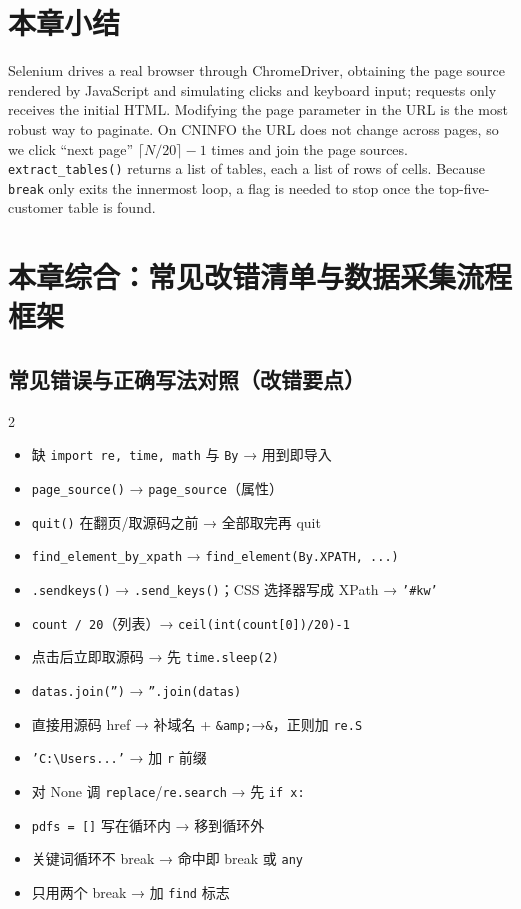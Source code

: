 \section{本章小结}
\begin{english}
Selenium drives a real browser through ChromeDriver, obtaining the page source rendered by JavaScript and simulating clicks and keyboard input; requests only receives the initial HTML. Modifying the page parameter in the URL is the most robust way to paginate. On CNINFO the URL does not change across pages, so we click ``next page'' $\lceil N/20\rceil-1$ times and join the page sources. \texttt{extract\_tables()} returns a list of tables, each a list of rows of cells. Because \texttt{break} only exits the innermost loop, a flag is needed to stop once the top-five-customer table is found.
\end{english}

\section{本章综合：常见改错清单与数据采集流程框架}

\subsection{常见错误与正确写法对照（改错要点）}
\begin{multicols}{2}\small
\begin{itemize}
\item 缺 \texttt{import re, time, math} 与 \texttt{By} → 用到即导入
\item \texttt{page\_source()} → \texttt{page\_source}（属性）
\item \texttt{quit()} 在翻页/取源码之前 → 全部取完再 quit
\item \texttt{find\_element\_by\_xpath} → \texttt{find\_element(By.XPATH, ...)}
\item \texttt{.sendkeys()} → \texttt{.send\_keys()}；CSS 选择器写成 XPath → \texttt{'\#kw'}
\item \texttt{count / 20}（列表）→ \texttt{ceil(int(count[0])/20)-1}
\item 点击后立即取源码 → 先 \texttt{time.sleep(2)}
\item \texttt{datas.join('')} → \texttt{''.join(datas)}
\item 直接用源码 href → 补域名 + \texttt{\&amp;}→\texttt{\&}，正则加 \texttt{re.S}
\item \texttt{'C:\textbackslash Users...'} → 加 \texttt{r} 前缀
\item 对 None 调 \texttt{replace}/\texttt{re.search} → 先 \texttt{if x:}
\item \texttt{pdfs = []} 写在循环内 → 移到循环外
\item 关键词循环不 break → 命中即 break 或 \texttt{any}
\item 只用两个 break → 加 \texttt{find} 标志
\end{itemize}
\end{multicols}

